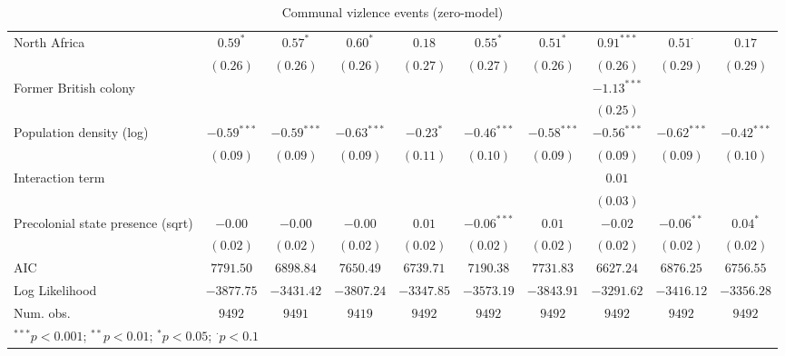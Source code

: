 \begin{sidewaystable}
\begin{center}
{\begin{tabular}{l c c c c c c c c c}
North Africa                          & $0.59^{*}$    & $0.57^{*}$    & $0.60^{*}$    & $0.18$        & $0.55^{*}$      & $0.51^{*}$    & $0.91^{***}$  & $0.51^{\cdot}$ & $0.17$        \\
                                      & $(0.26)$      & $(0.26)$      & $(0.26)$      & $(0.27)$      & $(0.27)$        & $(0.26)$      & $(0.26)$      & $(0.29)$       & $(0.29)$      \\
Former British colony                 &               &               &               &               &                 &               & $-1.13^{***}$ &                &               \\
                                      &               &               &               &               &                 &               & $(0.25)$      &                &               \\
Population density (log)              & $-0.59^{***}$ & $-0.59^{***}$ & $-0.63^{***}$ & $-0.23^{*}$   & $-0.46^{***}$   & $-0.58^{***}$ & $-0.56^{***}$ & $-0.62^{***}$  & $-0.42^{***}$ \\
                                      & $(0.09)$      & $(0.09)$      & $(0.09)$      & $(0.11)$      & $(0.10)$        & $(0.09)$      & $(0.09)$      & $(0.09)$       & $(0.10)$      \\
Interaction term                      &               &               &               &               &                 &               & $0.01$        &                &               \\
                                      &               &               &               &               &                 &               & $(0.03)$      &                &               \\
Precolonial state presence (sqrt)     & $-0.00$       & $-0.00$       & $-0.00$       & $0.01$        & $-0.06^{***}$   & $0.01$        & $-0.02$       & $-0.06^{**}$   & $0.04^{*}$    \\
                                      & $(0.02)$      & $(0.02)$      & $(0.02)$      & $(0.02)$      & $(0.02)$        & $(0.02)$      & $(0.02)$      & $(0.02)$       & $(0.02)$      \\
\midrule
AIC                                   & $7791.50$     & $6898.84$     & $7650.49$     & $6739.71$     & $7190.38$       & $7731.83$     & $6627.24$     & $6876.25$      & $6756.55$     \\
Log Likelihood                        & $-3877.75$    & $-3431.42$    & $-3807.24$    & $-3347.85$    & $-3573.19$      & $-3843.91$    & $-3291.62$    & $-3416.12$     & $-3356.28$    \\
Num. obs.                             & $9492$        & $9491$        & $9419$        & $9492$        & $9492$          & $9492$        & $9492$        & $9492$         & $9492$        \\
\bottomrule
\multicolumn{10}{l}{\scriptsize{$^{***}p<0.001$; $^{**}p<0.01$; $^{*}p<0.05$; $^{\cdot}p<0.1$}}
\end{tabular}
}
\caption{Communal vizlence events (zero-model)}
\label{zorg3}
\end{center}
\end{sidewaystable}
